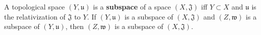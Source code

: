 A topological space $(Y, \mathfrak{u})$ is a \textbf{subspace} of a space $(X, \mathfrak{J})$ iff $Y \subset X$ and $\mathfrak{u}$ is the relativization of $\mathfrak{J}$ to $Y$. If $(Y, \mathfrak{u})$ is a subspace of $(X, \mathfrak{J})$ and $(Z, \mathfrak{w})$ is a subspace of $(Y, \mathfrak{u})$, then $(Z, \mathfrak{w})$ is a subspace of $(X, \mathfrak{J})$.
